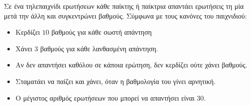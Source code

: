 \documentclass[11pt,a4paper,twoside]{book}
\begin{document}
Σε ένα τηλεπαιχνίδι ερωτήσεων κάθε παίκτης ή παίκτρια απαντάει ερωτήσεις τη μία μετά την άλλη και συγκεντρώνει βαθμούς. Σύμφωνα με τους κανόνες του παιχνιδιού:

\begin{itemize}
\item
  Κερδίζει $10$ βαθμούς για κάθε σωστή απάντηση
\item
  Χάνει $3$ βαθμούς για κάθε λανθασμένη απάντηση.
\item
  Αν δεν απαντήσει καθόλου σε κάποια ερώτηση, δεν κερδίζει ούτε χάνει βαθμούς.
\item
  Σταματάει να παίζει και χάνει, όταν η βαθμολογία του γίνει αρνητική.
\item
  Ο μέγιστος αριθμός ερωτήσεων που μπορεί να απαντήσει είναι $30$.
\end{itemize}
\end{document}
